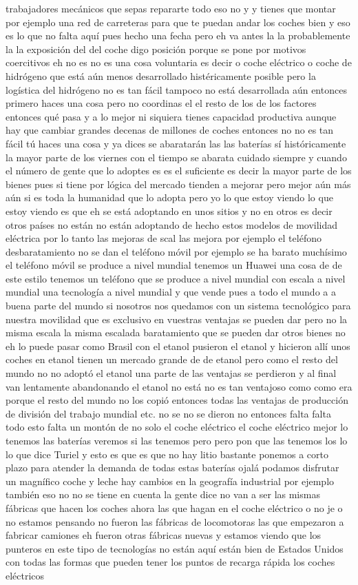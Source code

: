 trabajadores mecánicos que sepas repararte todo eso no y y tienes que montar por ejemplo una red de carreteras para que te puedan andar los coches bien y eso es lo que no falta aquí pues hecho una fecha pero eh va antes la la probablemente la la exposición del del coche digo posición porque se pone por motivos coercitivos eh no es no es una cosa voluntaria es decir o coche eléctrico o coche de hidrógeno que está aún menos desarrollado histéricamente posible pero la logística del hidrógeno no es tan fácil tampoco no está desarrollada aún entonces primero haces una cosa pero no coordinas el el resto de los de los factores entonces qué pasa y a lo mejor ni siquiera tienes capacidad productiva aunque hay que cambiar grandes decenas de millones de coches entonces no no es tan fácil tú haces una cosa y ya dices se abaratarán las las baterías sí históricamente la mayor parte de los viernes con el tiempo se abarata cuidado siempre y cuando el número de gente que lo adoptes es es el suficiente es decir la mayor parte de los bienes pues si tiene por lógica del mercado tienden a mejorar pero mejor aún más aún si es toda la humanidad que lo adopta pero yo lo que estoy viendo lo que estoy viendo es que eh se está adoptando en unos sitios y no en otros es decir otros países no están no están adoptando de hecho estos modelos de movilidad eléctrica por lo tanto las mejoras de scal las mejora por ejemplo el teléfono desbaratamiento no se dan el teléfono móvil por ejemplo se ha barato muchísimo el teléfono móvil se produce a nivel mundial tenemos un Huawei una cosa de de este estilo tenemos un teléfono que se produce a nivel mundial con escala a nivel mundial una tecnología a nivel mundial y que vende pues a todo el mundo a a buena parte del mundo si nosotros nos quedamos con un sistema tecnológico para nuestra movilidad que es exclusivo en vuestras ventajas se pueden dar pero no la misma escala la misma escalada baratamiento que se pueden dar otros bienes no eh lo puede pasar como Brasil con el etanol pusieron el etanol y hicieron allí unos coches en etanol tienen un mercado grande de de etanol pero como el resto del mundo no no adoptó el etanol una parte de las ventajas se perdieron y al final van lentamente abandonando el etanol no está no es tan ventajoso como como era porque el resto del mundo no los copió entonces todas las ventajas de producción de división del trabajo mundial etc. no se no se dieron no entonces falta falta todo esto falta un montón de no solo el coche eléctrico el coche eléctrico mejor lo tenemos las baterías veremos si las tenemos pero pero pon que las tenemos los lo lo que dice Turiel y esto es que es que no hay litio bastante ponemos a corto plazo para atender la demanda de todas estas baterías ojalá podamos disfrutar un magnífico coche y leche hay cambios en la geografía industrial por ejemplo también eso no no se tiene en cuenta la gente dice no van a ser las mismas fábricas que hacen los coches ahora las que hagan en el coche eléctrico o no je o no estamos pensando no fueron las fábricas de locomotoras las que empezaron a fabricar camiones eh fueron otras fábricas nuevas y estamos viendo que los punteros en este tipo de tecnologías no están aquí están bien de Estados Unidos con todas las formas que pueden tener los puntos de recarga rápida los coches eléctricos 